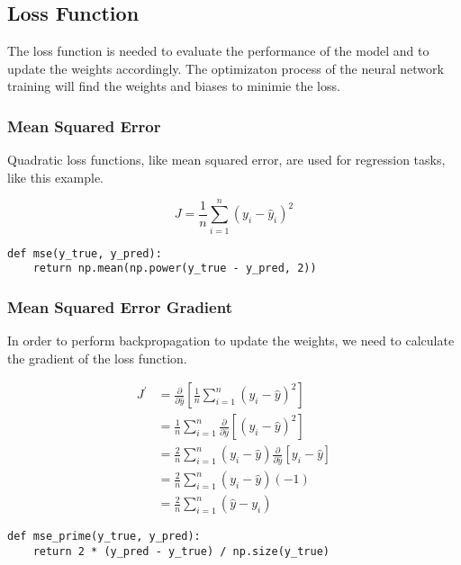 \documentclass[openany]{book}
\begin{document}
    \subsection{Loss Function}\label{loss-function}

The loss function is needed to evaluate the performance of the model and
to update the weights accordingly. The optimizaton process of the neural
network training will find the weights and biases to minimie the loss.

    \subsubsection{Mean Squared Error}\label{mean-squared-error}

Quadratic loss functions, like mean squared error, are used for
regression tasks, like this example.

\[
J = \frac{1}{n} \sum_{i=1}^{n} (y_i - \hat{y}_i)^2
\]

\begin{tcolorbox}
\tiny
\begin{verbatim}
def mse(y_true, y_pred):
    return np.mean(np.power(y_true - y_pred, 2))
\end{verbatim}
\end{tcolorbox}

    \subsubsection{Mean Squared Error
Gradient}\label{mean-squared-error-gradient}

In order to perform backpropagation to update the weights, we need to
calculate the gradient of the loss function.

\begin{align*}
J^{\prime} &= \frac{\partial}{\partial \hat{y}} [ \frac{1}{n} \sum_{i=1}^{n}(y_{i}-\hat{y})^2 ] \\
&= \frac{1}{n} \sum_{i=1}^{n}\frac{\partial}{\partial \hat{y}} [ (y_{i}-\hat{y})^2 ] \\
&= \frac{2}{n} \sum_{i=1}^{n} (y_{i}-\hat{y}) \frac{\partial}{\partial \hat{y}}[y_{i}-\hat{y}] \\
&= \frac{2}{n} \sum_{i=1}^{n} (y_{i}-\hat{y}) (-1) \\
&= \frac{2}{n} \sum_{i=1}^{n}(\hat{y}-y_{i})
\end{align*}

\begin{tcolorbox}
\tiny
\begin{verbatim}
def mse_prime(y_true, y_pred):
    return 2 * (y_pred - y_true) / np.size(y_true)
\end{verbatim}
\end{tcolorbox}
\end{document}
